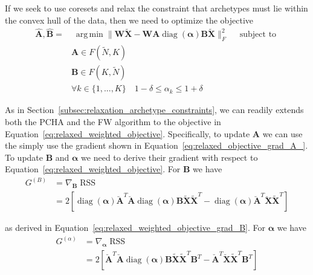 \documentclass[oneside]{article}
\DeclareMathOperator*{\argmin}{arg\,min}
\begin{document}
If we seek to use coresets and relax the constraint that archetypes must lie within the convex hull of the data, then we need to optimize the objective
\begin{equation}
\label{eq:relaxed_weighted_objective}
    \begin{aligned}
        \hat{\mathbf{A}}, \hat{\mathbf{B}} =& \; \underset{}{\argmin}
        \| \mathbf{W} \tilde{\mathbf{X}} -  \mathbf{W} {\mathbf{A}} \operatorname{diag}(\boldsymbol{\alpha}) \mathbf{B} \tilde{\mathbf{X}} \|_F^2 \quad \text{ subject to } \\
        & \mathbf{A} \in F(\tilde{N}, K) \\
        & \mathbf{B} \in F(K, \tilde{N}) \\
        & \forall k \in \{1, ..., K\} \quad 1 - \delta \leq \alpha_k \leq 1 + \delta
    \end{aligned}
\end{equation}

As in Section~\ref{subsec:relaxation_archetype_constraints}, we can readily extends both the PCHA and the FW algorithm to the objective in Equation~\ref{eq:relaxed_weighted_objective}. Specifically, to update $\mathbf{A}$ we can use the simply use the gradient shown in Equation~\ref{eq:relaxed_objective_grad_A_}. To update $\mathbf{B}$ and $\boldsymbol{\alpha}$ we need to derive their gradient with respect to Equation~\ref{eq:relaxed_weighted_objective}. For $\mathbf{B}$ we have
\begin{equation}
    \label{eq:relaxed_weighted_objective_grad_B_}
    \begin{aligned}
        G^{(B)}
        &= \nabla_{\mathbf{B}} \operatorname{RSS} \\
        &= 2
        \left[
            \operatorname{diag}(\boldsymbol{\alpha}) \breve{\mathbf{A}}^T \breve{\mathbf{A}} \operatorname{diag}(\boldsymbol{\alpha}) \mathbf{B} \tilde{\mathbf{X}} \tilde{\mathbf{X}}^T
            - \operatorname{diag}(\boldsymbol{\alpha}) \breve{\mathbf{A}}^T \breve{\mathbf{X}} \tilde{\mathbf{X}}^T
        \right]
    \end{aligned}
\end{equation}

as derived in Equation~\ref{eq:relaxed_weighted_objective_grad_B}. For $\boldsymbol{\alpha}$ we have
\begin{equation}
    \label{eq:relaxed_weighted_objective_grad_alpha_}
    \begin{aligned}
        G^{(\alpha)}
        &= \nabla_{\boldsymbol{\alpha}} \operatorname{RSS} \\
        & = 2
        \left[
            \breve{\mathbf{A}}^T \breve{\mathbf{A}} \operatorname{diag}(\boldsymbol{\alpha}) \mathbf{B} \tilde{\mathbf{X}} \tilde{\mathbf{X}}^T \mathbf{B}^T
            - \breve{\mathbf{A}}^T \breve{\mathbf{X}} \tilde{\mathbf{X}}^T \mathbf{B}^T
        \right]
    \end{aligned}
\end{equation}
\end{document}
